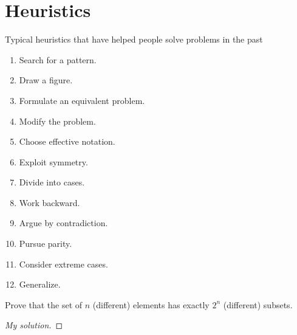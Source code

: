 \chapter{Heuristics}
Typical heuristics that have helped people solve problems in the past
\begin{enumerate}[label=(\arabic*),noitemsep]
\item Search for a pattern.
\item Draw a figure.
\item Formulate an equivalent problem.
\item Modify the problem.
\item Choose effective notation.
\item Exploit symmetry.
\item Divide into cases.
\item Work backward.
\item Argue by contradiction.
\item Pursue parity.
\item Consider extreme cases.
\item Generalize.
\end{enumerate}
\begin{exercise}
Prove that the set of $n$ (different) elements has exactly $2^n$
(different) subsets.
\end{exercise}
\begin{proof}[My solution]
\end{proof}

